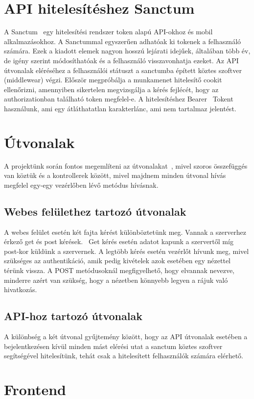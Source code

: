 \documentclass[
]{thesis-ekf}
\theoremstyle{definition}
\theoremstyle{remark}
\begin{document}
\section{API hitelesítéshez Sanctum}

A Sanctum~\cite{laravel_sanctum} egy hitelesítési rendszer token alapú API-okhoz és mobil alkalmazásokhoz. A Sanctummal egyszerűen adhatóak ki tokenek a felhasználó számára. Ezek a kiadott elemek nagyon hosszú lejárati idejűek, általában több év, de igény szerint módosíthatóak és a felhasználó visszavonhatja ezeket. Az API útvonalak eléréséhez a felhasználói státuszt a sanctumba épített köztes szoftver (middlewear) végzi. Először megpróbálja a munkamenet hitelesítő cookit ellenőrizni, amennyiben sikertelen megvizsgálja a kérés fejlécét, hogy az authorizationban található token megfelel-e. A hitelesítéshez Bearer~\cite{bearer_token} Tokent használunk, ami egy átláthatatlan karakterlánc, ami nem tartalmaz jelentést.

\section{Útvonalak}
A projektünk során fontos megemlíteni az útvonalakat~\cite{laravel_route}, mivel szoros összefüggés van köztük és a kontrollerek között, mivel majdnem minden útvonal hívás megfelel egy-egy vezérlőben lévő metódus hívásnak. 
\subsection{Webes felülethez tartozó útvonalak}
A webes felület esetén két fajta kérést különböztetünk meg. Vannak a szerverhez érkező get és post kérések.~\cite{get_post_difference} Get kérés esetén adatot kapunk a szervertől míg post-kor küldünk a szervernek. A legtöbb kérés esetén vezérlőt hívunk meg, mivel szükséges az authentikáció, amik pedig kivételek azok esetében egy nézettel térünk vissza. A POST metódusoknál megfigyelhető, hogy elvannak nevezve, minderre azért van szükség, hogy a nézetben könnyebb legyen a rájuk való hivatkozás. 
\subsection{API-hoz tartozó útvonalak}
A különbség a két útvonal gyűjtemény között, hogy az API útvonalak esetében a bejelentkezésen kívül minden mást elérési utat a sanctum köztes szoftver segítségével hitelesítünk, tehát csak a hitelesített felhasználók számára elérhető. 

\section{Frontend}
\end{document}
